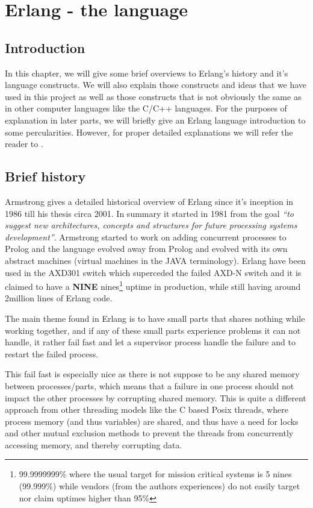 \documentclass[a4paper,11pt]{report}
\begin{document}
\chapter{Erlang - the language}

\section{Introduction}

In this chapter, we will give some brief overviews to Erlang's history
and it's language constructs. We will also explain those constructs
and ideas that we have used in this project as well as those
constructs that is not obviously the same as in other computer
languages like the C/C++ languages.	 For the purposes of explanation
in later parts, we will briefly give an Erlang language introduction
to some percularities. However, for proper detailed explanations we will refer
the reader to \cite{Armstrong}.



\section{Brief history}

Armstrong \cite{thesis:armstrong} gives a detailed historical overview
of Erlang since it's inception in 1986 till his thesis circa 2001. In
summary it started in 1981 from the goal \emph{``to suggest new
  architectures, concepts and structures for future processing systems
  development''}. Armstrong started to work on adding concurrent
processes to Prolog and the language evolved away from Prolog and
evolved with its own abstract machines (virtual machines in the JAVA
terminology). Erlang have been used in the AXD301 switch which
superceded the failed AXD-N switch and it is claimed to have a
\textbf{NINE} nines\footnote{99.9999999\% where the usual target for
  mission critical systems is 5 nines (99.999\%) while vendors (from
  the authors experiences) do not easily target nor claim uptimes
  higher than 95\%} uptime in production, while still having around
2million lines of Erlang code.

The main theme found in Erlang is to have small parts that shares
nothing while working together, and if any of these small parts
experience problems it can not handle, it rather fail fast and let a
supervisor process handle the failure and to restart the failed
process.

This fail fast is especially nice as there is not suppose to be any
shared memory between processes/parts, which means that a failure in
one process should not impact the other processes by corrupting shared
memory. This is quite a different approach from other threading models
like the C based Posix threads, where process memory (and thus
variables) are shared, and thus have a need for locks and other mutual
exclusion methods to prevent the threads from concurrently accessing
memory, and thereby corrupting data. 
\end{document}
